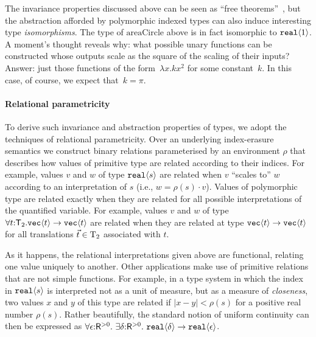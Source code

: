 The invariance properties discussed above can be seen as ``free
theorems''~\cite{wadler89theorems}, but the abstraction afforded by
polymorphic indexed types can also induce interesting type
\emph{isomorphisms}.  The type of $\mathrm{areaCircle}$ above is in
fact isomorphic to $\textup{\texttt{real}}\langle 1 \rangle$. A moment's thought reveals why:
what possible unary functions can be constructed whose outputs scale
as the square of the scaling of their inputs?  Answer: just those
functions of the form~$\lambda x. k x^2$ for some constant~$k$.  In
this case, of course, we expect that~$k = \pi$.

\paragraph{Relational parametricity}
To derive such invariance and abstraction properties of types, we
adopt the techniques of relational parametricity. Over an underlying
index-erasure semantics we construct binary relations parameterised by
an environment $\rho$ that describes how values of primitive type are
related according to their indices.  For example, values $v$ and $w$
of type $\textup{\texttt{real}}\langle s \rangle$ are related when $v$ ``scales to'' $w$
according to an interpretation of $s$ (i.e., $w=\rho(s)\cdot
v$).  Values of polymorphic type are related exactly when they are
related for all possible interpretations of the quantified
variable. For example, values $v$ and $w$ of type
$\forall t\mathord:\mathsf{T}_2.\textup{\texttt{vec}}\langle t \rangle\to
\textup{\texttt{vec}}\langle t \rangle$ are related when they are related at type
$\textup{\texttt{vec}}\langle t \rangle\to\textup{\texttt{vec}}\langle t \rangle$ for all translations
$\vec t\in\mathrm{T}_2$ associated with $t$.

As it happens, the relational interpretations given above are
functional, relating one value uniquely to another. Other applications
make use of primitive relations that are not simple functions.
For example, in a type system in which the index in
$\textup{\texttt{real}}\langle s \rangle$ is interpreted not as a unit of measure, but as
a measure of \emph{closeness}, two values $x$ and $y$ of this type are
related if $|x-y| < \rho(s)$ for a positive real number
$\rho(s)$.  Rather beautifully, the standard notion of uniform
continuity can then be expressed as %
 $ \forall \epsilon \mathord: \mathsf{R}^{>0}.\ \exists \delta\mathord: \mathsf{R}^{>0}.\ \tyPrim{real}{\delta} \to \tyPrim{real}{\epsilon}$.

